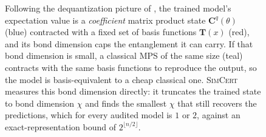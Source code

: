 \begin{figure}[h]
\caption{Following the dequantization picture of \citet{shin2024}, the trained model's expectation value is a \emph{coefficient} matrix product
state $\mathbf{C}^{q}(\theta)$ (blue) contracted with a fixed set of basis functions
$\mathbf{T}(x)$ (red), and its bond dimension caps the entanglement it can carry. If that bond
dimension is small, a classical MPS of the same size (teal) contracts with the same basis functions
to reproduce the output, so the model is basis-equivalent to a cheap classical one. \textsc{SimCert}
measures this bond dimension directly: it truncates the trained state to bond dimension $\chi$ and
finds the smallest $\chi$ that still recovers the predictions, which for every audited model is $1$
or $2$, against an exact-representation bound of $2^{\lfloor n/2\rfloor}$.}
\label{fig:tn}
\end{figure}
